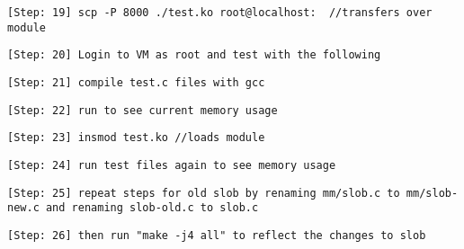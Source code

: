\documentclass[10pt,letterpaper,draftclsnofoot,onecolumn]{IEEEtran}
\begin{document}
\begin{description}
\item \texttt{[Step: 19] scp -P 8000 ./test.ko root@localhost:~ \newline //transfers over module}
\item \texttt{[Step: 20] Login to VM as root and test with the following}
\item \texttt{[Step: 21] compile test.c files with gcc}
\item \texttt{[Step: 22] run to see current memory usage}
\item \texttt{[Step: 23] insmod test.ko \newline //loads module}
\item \texttt{[Step: 24] run test files again to see memory usage}
\item \texttt{[Step: 25] repeat steps for old slob by renaming mm/slob.c to mm/slob-new.c and renaming slob-old.c to slob.c}
\item \texttt{[Step: 26] then run "make -j4 all" to reflect the changes to slob}
\end{description}



\end{document}
